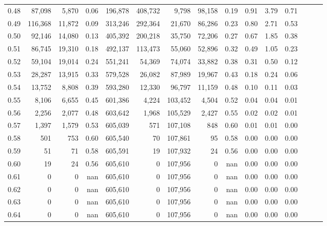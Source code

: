 \begin{tabular}{rrrrrrrrrrrrrrr}
0.48 &   87,098 &   5,870 &  0.06 &  196,878 &  408,732 &    9,798 &   98,158 &  0.19 &  0.91 &  3.79 &      0.71 \\
0.49 &  116,368 &  11,872 &  0.09 &  313,246 &  292,364 &   21,670 &   86,286 &  0.23 &  0.80 &  2.71 &      0.53 \\
0.50 &   92,146 &  14,080 &  0.13 &  405,392 &  200,218 &   35,750 &   72,206 &  0.27 &  0.67 &  1.85 &      0.38 \\
0.51 &   86,745 &  19,310 &  0.18 &  492,137 &  113,473 &   55,060 &   52,896 &  0.32 &  0.49 &  1.05 &      0.23 \\
0.52 &   59,104 &  19,014 &  0.24 &  551,241 &   54,369 &   74,074 &   33,882 &  0.38 &  0.31 &  0.50 &      0.12 \\
0.53 &   28,287 &  13,915 &  0.33 &  579,528 &   26,082 &   87,989 &   19,967 &  0.43 &  0.18 &  0.24 &      0.06 \\
0.54 &   13,752 &   8,808 &  0.39 &  593,280 &   12,330 &   96,797 &   11,159 &  0.48 &  0.10 &  0.11 &      0.03 \\
0.55 &    8,106 &   6,655 &  0.45 &  601,386 &    4,224 &  103,452 &    4,504 &  0.52 &  0.04 &  0.04 &      0.01 \\
0.56 &    2,256 &   2,077 &  0.48 &  603,642 &    1,968 &  105,529 &    2,427 &  0.55 &  0.02 &  0.02 &      0.01 \\
0.57 &    1,397 &   1,579 &  0.53 &  605,039 &      571 &  107,108 &      848 &  0.60 &  0.01 &  0.01 &      0.00 \\
0.58 &      501 &     753 &  0.60 &  605,540 &       70 &  107,861 &       95 &  0.58 &  0.00 &  0.00 &      0.00 \\
0.59 &       51 &      71 &  0.58 &  605,591 &       19 &  107,932 &       24 &  0.56 &  0.00 &  0.00 &      0.00 \\
0.60 &       19 &      24 &  0.56 &  605,610 &        0 &  107,956 &        0 &   nan &  0.00 &  0.00 &      0.00 \\
0.61 &        0 &       0 &   nan &  605,610 &        0 &  107,956 &        0 &   nan &  0.00 &  0.00 &      0.00 \\
0.62 &        0 &       0 &   nan &  605,610 &        0 &  107,956 &        0 &   nan &  0.00 &  0.00 &      0.00 \\
0.63 &        0 &       0 &   nan &  605,610 &        0 &  107,956 &        0 &   nan &  0.00 &  0.00 &      0.00 \\
0.64 &        0 &       0 &   nan &  605,610 &        0 &  107,956 &        0 &   nan &  0.00 &  0.00 &      0.00 \\

\end{tabular}
